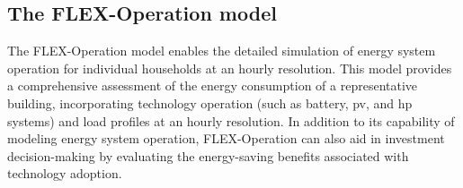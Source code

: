 


\subsection{The FLEX-Operation model}

The FLEX-Operation model \cite{newtrends} enables the detailed simulation of energy system operation for individual households at an hourly resolution. 
This model provides a comprehensive assessment of the energy consumption of a representative building, incorporating technology operation (such as battery, \gls{pv}, and \gls{hp} systems) and load profiles at an hourly resolution. 
In addition to its capability of modeling energy system operation, FLEX-Operation can also aid in investment decision-making by evaluating the energy-saving benefits associated with technology adoption.

